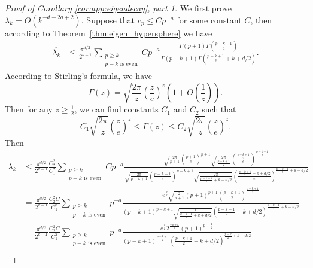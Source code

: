 \begin{proof}[Proof of Corollary \ref{cor:app:eigendecay}, part 1]
We first prove $\overline{\lambda_k}=O(k^{-d-2a+2})$. Suppose that $c_p\leq C p^{-a}$ for some constant $C$, then according to Theorem~\ref{thm:eigen_hypersphere} we have
\begin{align*}
\overline{\lambda_k} 
&\leq \frac{\pi^{d/2}}{2^{k-1}}\sum_{\substack{p\geq k\\p-k\text{ is even}}} C p^{-a} \frac{ \Gamma(p+1)\Gamma(\frac{p-k+1}{2})}{\Gamma(p-k+1)\Gamma(\frac{p-k+1}{2}+k+d/2)}.
\end{align*}
According to Stirling's formula, we have
\begin{equation}
\label{eq:stirling}
    \Gamma(z)=\sqrt{\frac{2\pi}{z}}\left(\frac{z}{e}\right)^z\left(1+O\left(\frac{1}{z}\right)\right).
\end{equation}
Then for any $z\geq \frac{1}{2}$, we can find constants $C_1$ and $C_2$ such that
\begin{equation}
\label{eq:stirling_1}
    C_1\sqrt{\frac{2\pi}{z}}\left(\frac{z}{e}\right)^z\leq\Gamma(z)\leq C_2\sqrt{\frac{2\pi}{z}}\left(\frac{z}{e}\right)^z.
\end{equation}
Then 
\begin{align}
\overline{\lambda_k} 
&\leq \frac{\pi^{d/2}}{2^{k-1}}\frac{C_2^2}{C_1^2}\sum_{\substack{p\geq k\\p-k\text{ is even}}} C p^{-a} \frac{ \sqrt{\frac{2\pi}{p+1}}\left(\frac{p+1}{e}\right)^{p+1}\sqrt{\frac{2\pi}{\frac{p-k+1}{2}}}\left(\frac{\frac{p-k+1}{2}}{e}\right)^\frac{p-k+1}{2}}{\sqrt{\frac{2\pi}{{p-k+1}}}\left(\frac{p-k+1}{e}\right)^{p-k+1}\sqrt{\frac{2\pi}{\frac{p-k+1}{2}+k+d/2}}\left(\frac{\frac{p-k+1}{2}+k+d/2}{e}\right)^{\frac{p-k+1}{2}+k+d/2}} \nonumber\\
&= \frac{\pi^{d/2}}{2^{k-1}}\frac{C_2^2C}{C_1^2}\sum_{\substack{p\geq k\\p-k\text{ is even}}}p^{-a} \frac{e^{\frac{d}{2}} \sqrt{\frac{2}{p+1}}\left({p+1}\right)^{p+1}\left({\frac{p-k+1}{2}}\right)^\frac{p-k+1}{2}}{\left({p-k+1}\right)^{p-k+1}\sqrt{\frac{1}{\frac{p-k+1}{2}+k+d/2}}\left({\frac{p-k+1}{2}+k+d/2}\right)^{\frac{p-k+1}{2}+k+d/2}} \nonumber\\
&= \frac{\pi^{d/2}}{2^{k-1}}\frac{C_2^2C}{C_1^2}\sum_{\substack{p\geq k\\p-k\text{ is even}}}p^{-a} \frac{e^{\frac{d}{2}}2^{\frac{-p+k}{2}} \left({p+1}\right)^{p+\frac{1}{2}}}{\left({p-k+1}\right)^{\frac{p-k+1}{2}}\left({\frac{p-k+1}{2}+k+d/2}\right)^{\frac{p-k}{2}+k+d/2}} \nonumber\\

\end{align}
\end{proof}
